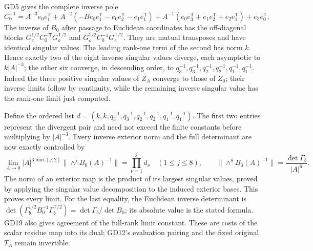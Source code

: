 GD5 gives the complete inverse pole
\begin{equation}
 C_0^{-1}=A^{-3}e_0e_1^{\mathsf T}
 +A^{-2}(-B e_0e_1^{\mathsf T}-e_0e_2^{\mathsf T}-e_1e_1^{\mathsf T})
 +A^{-1}(e_0e_3^{\mathsf T}+e_1e_2^{\mathsf T}+e_2e_1^{\mathsf T})
 +e_3e_0^{\mathsf T}.
 \tag{GD20}
\end{equation}
The inverse of $B_0$ after passage to Euclidean coordinates
has the off-diagonal blocks
$G_e^{1/2}C_0^{-\mathsf T}G_o^{\mathsf T/2}$ and
$G_o^{1/2}C_0^{-1}G_e^{\mathsf T/2}$. They are mutual
transposes and have identical singular values. The
leading rank-one term of the second has norm $k$.
Hence exactly two of the eight inverse singular values
diverge, each asymptotic to $k|A|^{-3}$; the other six
converge, in descending order, to
$q_3^{-1},q_3^{-1},q_2^{-1},q_2^{-1},q_1^{-1},q_1^{-1}$.
Indeed the three positive singular values of $Z_A$
converge to those of $Z_0$; their inverse limits follow
by continuity, while the remaining inverse singular
value has the rank-one limit just computed.

Define the ordered list
$d=(k,k,q_3^{-1},q_3^{-1},q_2^{-1},q_2^{-1},q_1^{-1},q_1^{-1})$.
The first two entries represent the divergent pair and
need not exceed the finite constants before multiplying
by $|A|^{-3}$. Every inverse exterior norm and the
full determinant are now exactly controlled by
\begin{equation}
 \lim_{A\to0}|A|^{3\min(j,2)}\|\wedge^j B_0(A)^{-1}\|
       =\prod_{\nu=1}^j d_\nu\quad(1\le j\le8),\qquad
 \|\wedge^8 B_0(A)^{-1}\|=\frac{\det\Gamma_b}{|A|^6}.
 \tag{GD21}
\end{equation}
The norm of an exterior map is the product of its
largest singular values, proved by applying the singular
value decomposition to the induced exterior bases.
This proves every limit. For the last equality, the
Euclidean inverse determinant is
$\det(\Gamma_b^{1/2}B_0^{-1}\Gamma_b^{\mathsf T/2})
 =\det\Gamma_b/\det B_0$; its absolute value is the
stated formula. GD19 also gives agreement of the
full-rank limit constant. These are costs of the
scalar residue map into its dual; GD12's evaluation
pairing and the fixed original $T_A$ remain invertible.

